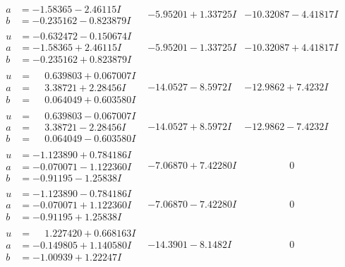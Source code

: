 \documentclass[1p]{elsarticle_modified}
\theoremstyle{definition}
\begin{document}
$$\begin{array}{c|c|c}
\begin{aligned}
a &= -1.58365 - 2.46115 I \\
b &= -0.235162 - 0.823879 I\end{aligned}
 & -5.95201 + 1.33725 I & -10.32087 - 4.41817 I \\ \hline\begin{aligned}
u &= -0.632472 - 0.150674 I \\
a &= -1.58365 + 2.46115 I \\
b &= -0.235162 + 0.823879 I\end{aligned}
 & -5.95201 - 1.33725 I & -10.32087 + 4.41817 I \\ \hline\begin{aligned}
u &= \phantom{-}0.639803 + 0.067007 I \\
a &= \phantom{-}3.38721 + 2.28456 I \\
b &= \phantom{-}0.064049 + 0.603580 I\end{aligned}
 & -14.0527 - 8.5972 I & -12.9862 + 7.4232 I \\ \hline\begin{aligned}
u &= \phantom{-}0.639803 - 0.067007 I \\
a &= \phantom{-}3.38721 - 2.28456 I \\
b &= \phantom{-}0.064049 - 0.603580 I\end{aligned}
 & -14.0527 + 8.5972 I & -12.9862 - 7.4232 I \\ \hline\begin{aligned}
u &= -1.123890 + 0.784186 I \\
a &= -0.070071 - 1.122360 I \\
b &= -0.91195 - 1.25838 I\end{aligned}
 & -7.06870 + 7.42280 I & \phantom{-0.000000 } 0 \\ \hline\begin{aligned}
u &= -1.123890 - 0.784186 I \\
a &= -0.070071 + 1.122360 I \\
b &= -0.91195 + 1.25838 I\end{aligned}
 & -7.06870 - 7.42280 I & \phantom{-0.000000 } 0 \\ \hline\begin{aligned}
u &= \phantom{-}1.227420 + 0.668163 I \\
a &= -0.149805 + 1.140580 I \\
b &= -1.00939 + 1.22247 I\end{aligned}
 & -14.3901 - 8.1482 I & \phantom{-0.000000 } 0 \\ \hline\begin{aligned}

\end{aligned}
\end{array}$$
\end{document}
